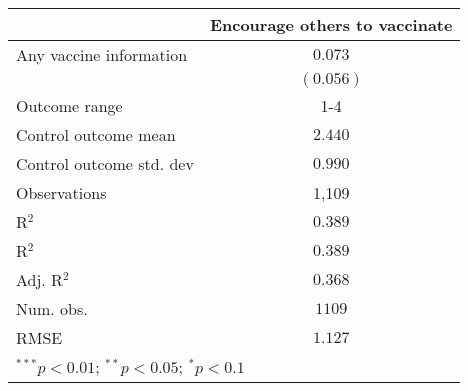 
\begin{table}
\begin{center}
\begin{tabular}{l c}
\hline
 & Encourage others to vaccinate \\
\hline
Any vaccine information  & $0.073$   \\
                         & $(0.056)$ \\
\hline
Outcome range            & 1-4       \\
Control outcome mean     & $2.440$   \\
Control outcome std. dev & $0.990$   \\
Observations             & 1,109     \\
R$^{2}$                  & $0.389$   \\
R$^2$                    & $0.389$   \\
Adj. R$^2$               & $0.368$   \\
Num. obs.                & $1109$    \\
RMSE                     & $1.127$   \\
\hline
\multicolumn{2}{l}{\scriptsize{$^{***}p<0.01$; $^{**}p<0.05$; $^{*}p<0.1$}}
\end{tabular}
\caption{}
\label{table:Tables and Figures/SI_table21_anyinfo_Argentina_encourage1-4}
\end{center}
\end{table}
